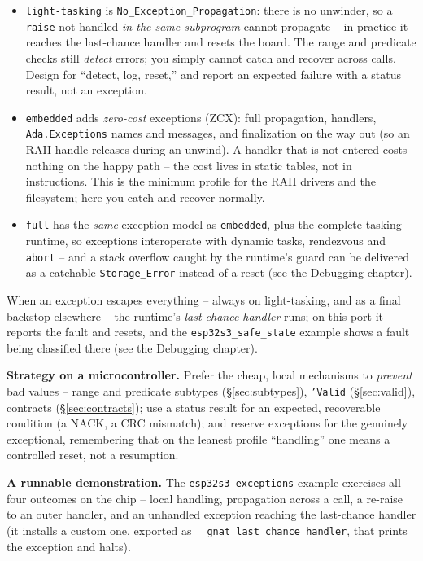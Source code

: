 \begin{itemize}
  \item \texttt{light-tasking} is \texttt{No\_Exception\_Propagation}: there is no
        unwinder, so a \texttt{raise} not handled \emph{in the same subprogram}
        cannot propagate -- in practice it reaches the last-chance handler and
        resets the board. The range and predicate checks still \emph{detect}
        errors; you simply cannot catch and recover across calls. Design for
        ``detect, log, reset,'' and report an expected failure with a status
        result, not an exception.
  \item \texttt{embedded} adds \emph{zero-cost} exceptions (ZCX): full propagation,
        handlers, \texttt{Ada.Exceptions} names and messages, and finalization on
        the way out (so an RAII handle releases during an unwind). A handler that
        is not entered costs nothing on the happy path -- the cost lives in static
        tables, not in instructions. This is the minimum profile for the RAII
        drivers and the filesystem; here you catch and recover normally.
  \item \texttt{full} has the \emph{same} exception model as \texttt{embedded},
        plus the complete tasking runtime, so exceptions interoperate with dynamic
        tasks, rendezvous and \texttt{abort} -- and a stack overflow caught by the
        runtime's guard can be delivered as a catchable \texttt{Storage\_Error}
        instead of a reset (see the Debugging chapter).
\end{itemize}

When an exception escapes everything -- always on light-tasking, and as a final
backstop elsewhere -- the runtime's \emph{last-chance handler} runs; on this port
it reports the fault and resets, and the \texttt{esp32s3\_safe\_state} example
shows a fault being classified there (see the Debugging chapter).

\textbf{Strategy on a microcontroller.} Prefer the cheap, local mechanisms to
\emph{prevent} bad values -- range and predicate subtypes (\S\ref{sec:subtypes}),
\texttt{'Valid} (\S\ref{sec:valid}), contracts (\S\ref{sec:contracts}); use a
status result for an expected, recoverable condition (a NACK, a CRC mismatch); and
reserve exceptions for the genuinely exceptional, remembering that on the leanest
profile ``handling'' one means a controlled reset, not a resumption.

\textbf{A runnable demonstration.} The \texttt{esp32s3\_exceptions} example
exercises all four outcomes on the chip -- local handling, propagation across a
call, a re-raise to an outer handler, and an unhandled exception reaching the
last-chance handler (it installs a custom one, exported as
\texttt{\_\_gnat\_last\_chance\_handler}, that prints the exception and halts).

